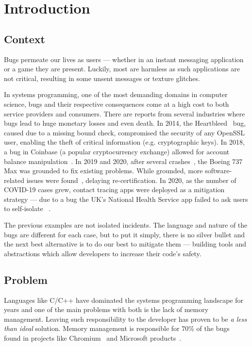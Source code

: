 \chapter{Introduction}\label{cha:introduction}

\section{Context}\label{sec:context}


Bugs permeate our lives as users --- whether in an instant messaging application or a game they are present.
Luckily, most are harmless as such applications are not critical,
resulting in some unsent messages or texture glitches.

In systems programming, one of the most demanding domains in computer science,
bugs and their respective consequences come at a high cost to both service providers and consumers.
There are reports from several industries where bugs lead to huge monetary losses and even death.
In 2014, the Heartbleed~\autocite{Heartbleed} bug, caused due to a missing bound check,
compromised the security of any OpenSSL user, enabling the theft of critical information (e.g. cryptographic keys).
In 2018, a bug in Coinbase (a popular cryptocurrency exchange)
allowed for account balance manipulation~\autocite{Vicompany2018}.
In 2019 and 2020, after several crashes~\autocite{Campbell2019},
the Boeing 737 Max was grounded to fix existing problems.
While grounded, more software-related issues were found~\autocite{Okane2019,Okane2020}, delaying re-certification.
In 2020, as the number of COVID-19 cases grew,
contact tracing apps were deployed as a mitigation strategy ---
due to a bug the UK's National Health Service app failed to ask users to self-isolate ~\autocite{Mageit2020}.

The previous examples are not isolated incidents.
The language and nature of the bugs are different for each case, but to put it simply,
there is no silver bullet and the next best alternative is to do our best to mitigate them ---
building tools and abstractions which allow developers to increase their code's safety.

\section{Problem}\label{sec:problem}

Languages like C/C++ have dominated the systems programming landscape for years and
one of the main problems with both is the lack of memory management.
Leaving such responsibility to the developer has proven to be \emph{a less than ideal} solution.
Memory management is responsible for $70\%$ of the bugs found in projects like Chromium~\autocite{chromium}
and Microsoft products~\autocite{Miller2019}.

